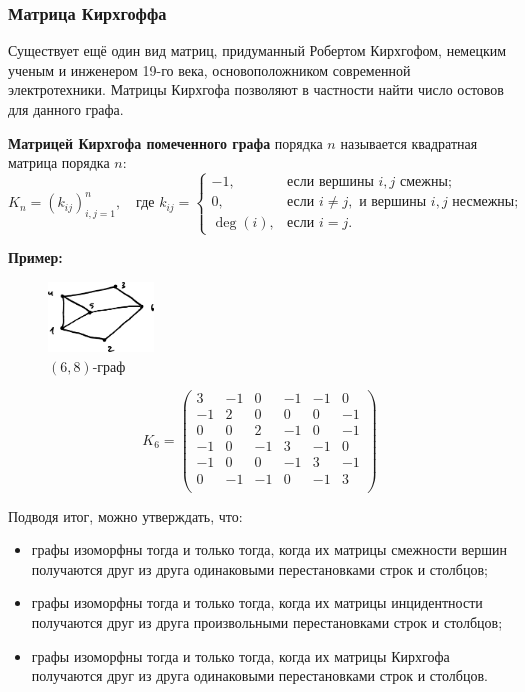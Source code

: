 \documentclass[12pt, a4paper]{article}
\begin{document}
\subsubsection{Матрица Кирхгоффа}

Существует ещё один вид матриц, придуманный Робертом Кирхгофом, немецким ученым и инженером 19-го века, основоположником современной электротехники. Матрицы Кирхгофа позволяют в частности найти число остовов для данного графа.

\textbf{Матрицей Кирхгофа помеченного графа} порядка $n$ называется квадратная матрица порядка $n$:
\[K_n = \left( k_{ij} \right)_{i,j=1}^{n}, \quad \textrm{где } k_{ij} = \begin{cases} -1, & \textrm{если вершины } i, j \textrm{ смежны}; \\ 0, & \textrm{если } i \not= j, \textrm{ и вершины } i,j \textrm{ несмежны}; \\ \deg(i), & \textrm{если } i=j. \end{cases} \]

\newpage

\textbf{Пример:}

\begin{figure}
  \vspace{-1mm}
  \centering
  \includegraphics[width=0.25\textwidth]{50}
  \vspace{-4mm}
 \caption{$(6,8)$-граф}
\end{figure}

\[K_6 = \begin{pmatrix}
3 & -1 & 0 & -1 & -1 & 0 \\
-1 & 2 & 0 & 0 & 0 & -1 \\
0 & 0 & 2 & -1 & 0 & -1 \\
-1 & 0 & -1 & 3 & -1 & 0 \\
-1 & 0 & 0 & -1 & 3 & -1 \\
0 & -1 & -1 & 0 & -1 & 3 \\
\end{pmatrix} \]

Подводя итог, можно утверждать, что:
\begin{itemize}
\item графы изоморфны тогда и только тогда, когда их матрицы смежности вершин получаются друг из друга одинаковыми перестановками строк и столбцов;
\item графы изоморфны тогда и только тогда, когда их матрицы инцидентности получаются друг из друга произвольными перестановками строк и столбцов;
\item графы изоморфны тогда и только тогда, когда их матрицы Кирхгофа получаются друг из друга одинаковыми перестановками строк и столбцов.
\end{itemize}
\end{document}
